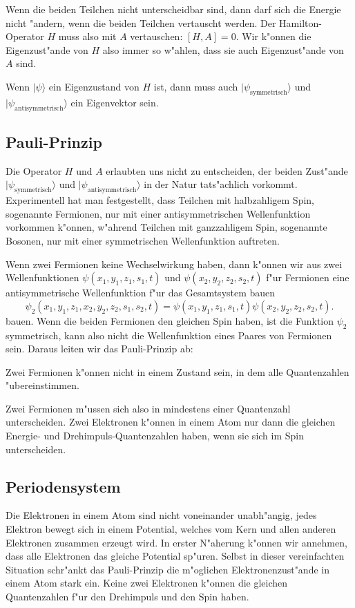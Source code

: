 Wenn die beiden Teilchen nicht unterscheidbar sind, dann darf sich
die Energie nicht "andern, wenn die beiden Teilchen vertauscht
werden. Der Hamilton-Operator $H$ muss also mit $A$ vertauschen:
$[H,A]=0$. Wir k"onnen die Eigenzust"ande von $H$ also immer so
w"ahlen, dass sie auch Eigenzust"ande von $A$ sind.

Wenn $|\psi\rangle$ ein Eigenzustand von $H$ ist, dann muss auch
$|\psi_{\text{symmetrisch}}\rangle$ und
$|\psi_{\text{antisymmetrisch}}\rangle$ ein Eigenvektor sein.

\subsection{Pauli-Prinzip}
Die Operator $H$ und $A$ erlaubten uns nicht zu entscheiden,
der beiden Zust"ande $|\psi_{\text{symmetrisch}}\rangle$ und
$|\psi_{\text{antisymmetrisch}}\rangle$ in der Natur tats"achlich
vorkommt.
Experimentell hat man festgestellt, dass Teilchen mit halbzahligem
Spin, sogenannte Fermionen, nur mit einer antisymmetrischen
Wellenfunktion vorkommen k"onnen, w"ahrend Teilchen mit
ganzzahligem Spin, sogenannte Bosonen, nur mit einer symmetrischen
Wellenfunktion auftreten.

Wenn zwei Fermionen keine Wechselwirkung haben, dann k"onnen wir
aus zwei Wellenfunktionen
$\psi(x_1,y_1,z_1,s_1,t)$
und
$\psi(x_2,y_2,z_2,s_2,t)$
f"ur Fermionen eine antisymmetrische Wellenfunktion f"ur das
Gesamtsystem bauen
\[
\psi_2(x_1,y_1,z_1,x_2,y_2,z_2,s_1,s_2,t)
=
\psi(x_1,y_1,z_1,s_1,t)
\psi(x_2,y_2,z_2,s_2,t).
\]
bauen.
Wenn die beiden Fermionen den gleichen Spin haben, ist die
Funktion $\psi_2$ symmetrisch, kann also nicht die Wellenfunktion
eines Paares von Fermionen sein. 
Daraus leiten wir das Pauli-Prinzip ab:

\begin{satz}
Zwei Fermionen k"onnen nicht in einem Zustand sein, in dem alle
Quantenzahlen "ubereinstimmen.
\end{satz}
Zwei Fermionen m"ussen sich also in mindestens einer Quantenzahl
unterscheiden.
Zwei Elektronen k"onnen in einem Atom nur dann die gleichen
Energie- und Drehimpuls-Quantenzahlen haben, wenn sie sich im
Spin unterscheiden.

\subsection{Periodensystem}
Die Elektronen in einem Atom sind nicht voneinander unabh"angig,
jedes Elektron bewegt sich in einem Potential, welches vom Kern
und allen anderen Elektronen zusammen erzeugt wird.
In erster N"aherung k"onnen wir annehmen, dass alle Elektronen
das gleiche Potential sp"uren.
Selbst in dieser vereinfachten Situation schr"ankt das Pauli-Prinzip
die m"oglichen Elektronenzust"ande in einem Atom stark ein.
Keine zwei Elektronen k"onnen die gleichen Quantenzahlen f"ur
den Drehimpuls und den Spin haben.

